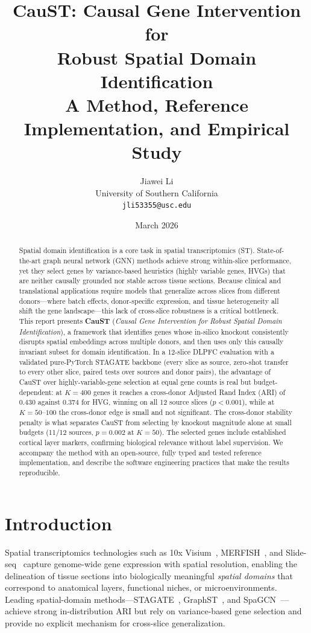 \documentclass[11pt]{article}
\title{\textbf{CauST: Causal Gene Intervention for\\ Robust Spatial Domain Identification}\\[4pt]
\large A Method, Reference Implementation, and Empirical Study}
\author{Jiawei Li\\ University of Southern California\\ \texttt{jli53355@usc.edu}}
\date{March 2026}
\begin{document}
\maketitle

\begin{abstract}
\noindent
Spatial domain identification is a core task in spatial transcriptomics (ST).
State-of-the-art graph neural network (GNN) methods achieve strong within-slice
performance, yet they select genes by variance-based heuristics (highly variable
genes, HVGs) that are neither causally grounded nor stable across tissue
sections. Because clinical and translational applications require models that
generalize across slices from different donors---where batch effects,
donor-specific expression, and tissue heterogeneity all shift the gene
landscape---this lack of cross-slice robustness is a critical bottleneck. This
report presents \textbf{CauST} (\emph{Causal Gene Intervention for Robust
Spatial Domain Identification}), a framework that identifies genes whose
in-silico knockout consistently disrupts spatial embeddings across multiple
donors, and then uses only this causally invariant subset for domain
identification. In a 12-slice DLPFC evaluation with a validated pure-PyTorch
STAGATE backbone (every slice as source, zero-shot transfer to every other
slice, paired tests over sources and donor pairs), the advantage of CauST over
highly-variable-gene selection at equal gene counts is real but budget-dependent:
at $K=400$ genes it reaches a cross-donor Adjusted Rand Index (ARI) of $0.430$
against $0.374$ for HVG, winning on all 12 source slices ($p<0.001$), while at
$K=50$--$100$ the cross-donor edge is small and not significant. The cross-donor
stability penalty is what separates CauST from selecting by knockout magnitude
alone at small budgets (11/12 sources, $p=0.002$ at $K=50$). The selected genes
include established cortical layer markers, confirming biological relevance without label supervision. We
accompany the method with an open-source, fully typed and tested reference
implementation, and describe the software engineering practices that make the
results reproducible.
\end{abstract}

\section{Introduction}
\label{sec:intro}

Spatial transcriptomics technologies such as 10x Visium~\citep{staahl2016}, MERFISH~\citep{chen2015}, and Slide-seq~\citep{rodriques2019} capture
genome-wide gene expression with spatial resolution, enabling the delineation of
tissue sections into biologically meaningful \emph{spatial domains} that
correspond to anatomical layers, functional niches, or microenvironments.
Leading spatial-domain methods---STAGATE~\citep{dong2022}, GraphST~\citep{long2023}, and
SpaGCN~\citep{hu2021}---achieve strong in-distribution ARI but rely on
variance-based gene selection and provide no explicit mechanism for cross-slice
generalization.
\end{document}
